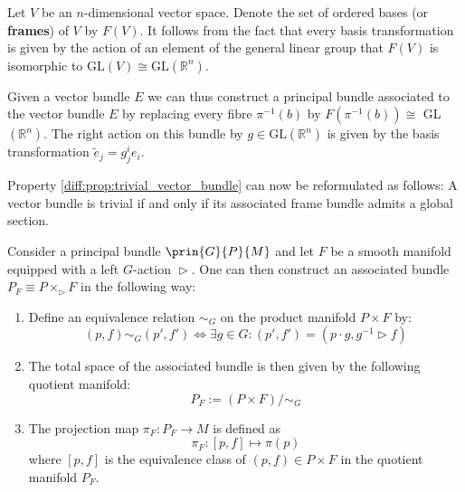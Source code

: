 	\begin{example}\label{bundles:frame_bundle}
		Let $V$ be an $n$-dimensional vector space. Denote the set of ordered bases (or \textbf{frames}) of $V$ by $F(V)$. It follows from the fact that every basis transformation is given by the action of an element of the general linear group that $F(V)$ is isomorphic to $\text{GL}(V)\cong\text{GL}(\mathbb{R}^n)$.
		
		Given a vector bundle $E$ we can thus construct a principal bundle associated to the vector bundle $E$ by replacing every fibre $\pi^{-1}(b)$ by $F(\pi^{-1}(b))\cong$ GL$(\mathbb{R}^n)$. The right action on this bundle by $g\in\text{GL}(\mathbb{R}^n)$ is given by the basis transformation $\widetilde{e}_j = g^i_je_i$.
	\end{example}
	\begin{property}\label{diff:prop:trivial_vector_bundle_frames}
		Property \ref{diff:prop:trivial_vector_bundle} can now be reformulated as follows: A vector bundle is trivial if and only if its associated frame bundle admits a global section.
	\end{property}
	
	\begin{construct}
		Consider a principal bundle $\prin{G}{P}{M}$ and let $F$ be a smooth manifold equipped with a left $G$-action $\vartriangleright$. One can then construct an associated bundle $P_F \equiv P \times_\vartriangleright F$ in the following way:
		\begin{enumerate}
			\item Define an equivalence relation $\sim_G$ on the product manifold $P\times F$ by:
			\begin{equation}
				\label{diff:prin:associated_bundle_equivalence}
				(p, f)\sim_G (p', f')\iff \exists g\in G: (p', f') = (p\cdot g, g^{-1}\vartriangleright f)
			\end{equation}
			\item The total space of the associated bundle is then given by the following quotient manifold:
			\begin{equation}
				P_F := (P\times F)/\sim_G
			\end{equation}
			\item The projection map $\pi_F:P_F\rightarrow M$ is defined as
			\begin{equation}
				\pi_F:[p, f]\mapsto \pi(p)
			\end{equation}
			where $[p, f]$ is the equivalence class of $(p, f)\in P\times F$ in the quotient manifold $P_F$.
		\end{enumerate}
	\end{construct}
	
